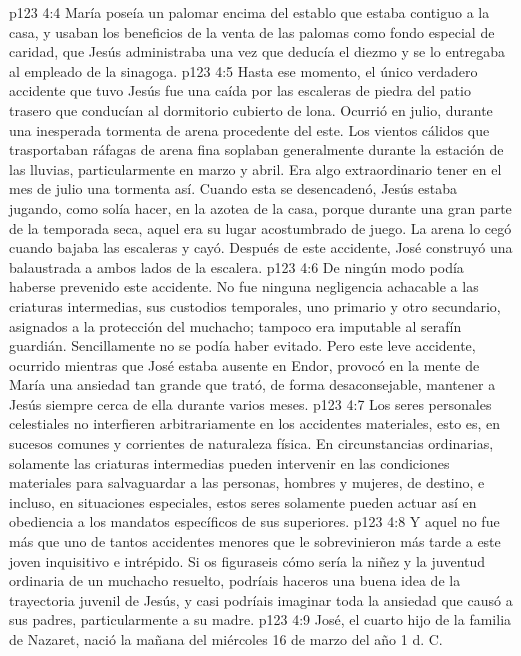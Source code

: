 \vs p123 4:4 María poseía un palomar encima del establo que estaba contiguo a la casa, y usaban los beneficios de la venta de las palomas como fondo especial de caridad, que Jesús administraba una vez que deducía el diezmo y se lo entregaba al empleado de la sinagoga.
\vs p123 4:5 \pc Hasta ese momento, el único verdadero accidente que tuvo Jesús fue una caída por las escaleras de piedra del patio trasero que conducían al dormitorio cubierto de lona. Ocurrió en julio, durante una inesperada tormenta de arena procedente del este. Los vientos cálidos que trasportaban ráfagas de arena fina soplaban generalmente durante la estación de las lluvias, particularmente en marzo y abril. Era algo extraordinario tener en el mes de julio una tormenta así. Cuando esta se desencadenó, Jesús estaba jugando, como solía hacer, en la azotea de la casa, porque durante una gran parte de la temporada seca, aquel era su lugar acostumbrado de juego. La arena lo cegó cuando bajaba las escaleras y cayó. Después de este accidente, José construyó una balaustrada a ambos lados de la escalera.
\vs p123 4:6 De ningún modo podía haberse prevenido este accidente. No fue ninguna negligencia achacable a las criaturas intermedias, sus custodios temporales, uno primario y otro secundario, asignados a la protección del muchacho; tampoco era imputable al serafín guardián. Sencillamente no se podía haber evitado. Pero este leve accidente, ocurrido mientras que José estaba ausente en Endor, provocó en la mente de María una ansiedad tan grande que trató, de forma desaconsejable, mantener a Jesús siempre cerca de ella durante varios meses.
\vs p123 4:7 Los seres personales celestiales no interfieren arbitrariamente en los accidentes materiales, esto es, en sucesos comunes y corrientes de naturaleza física. En circunstancias ordinarias, solamente las criaturas intermedias pueden intervenir en las condiciones materiales para salvaguardar a las personas, hombres y mujeres, de destino, e incluso, en situaciones especiales, estos seres solamente pueden actuar así en obediencia a los mandatos específicos de sus superiores.
\vs p123 4:8 Y aquel no fue más que uno de tantos accidentes menores que le sobrevinieron más tarde a este joven inquisitivo e intrépido. Si os figuraseis cómo sería la niñez y la juventud ordinaria de un muchacho resuelto, podríais haceros una buena idea de la trayectoria juvenil de Jesús, y casi podríais imaginar toda la ansiedad que causó a sus padres, particularmente a su madre.
\vs p123 4:9 \pc José, el cuarto hijo de la familia de Nazaret, nació la mañana del miércoles 16 de marzo del año 1 d. C.
